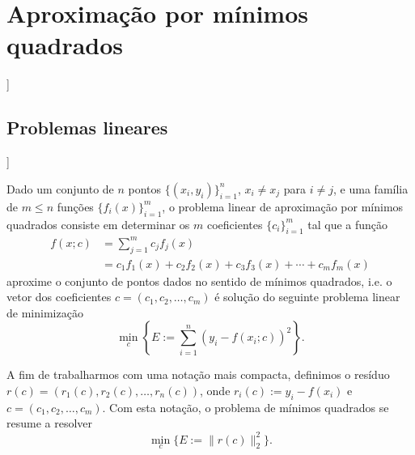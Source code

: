 
\chapter{Aproximação por mínimos quadrados}\label{cap_ajuste}
\thispagestyle{fancy}

\begin{flushleft}
  [[tag:revisar]]
\end{flushleft}

\section{Problemas lineares}\label{cap_ajuste_sec_prob_lin}

\begin{flushleft}
  [[tag:revisar]]
\end{flushleft}

Dado um conjunto de $n$ pontos $\{(x_i,y_i)\}_{i=1}^n$, $x_i\neq x_j$ para $i\neq j$, e uma família de $m \leq n$ funções $\{f_i(x)\}_{i=1}^m$, o problema linear de aproximação por mínimos quadrados consiste em determinar os $m$ coeficientes $\{c_i\}_{i=1}^m$ tal que a função
\begin{align}    
  f(x;c) &= \sum_{j=1}^m c_jf_j(x) \\
         &= c_1f_1(x) + c_2f_2(x) + c_3f_3(x) + \cdots + c_mf_m(x)
\end{align}
aproxime o conjunto de pontos dados no sentido de mínimos quadrados, i.e. o vetor dos coeficientes $c = (c_1, c_2, \dotsc, c_m)$ é solução do seguinte problema linear de minimização
\begin{equation}
  \min_{c} \left\{E:= \sum_{i=1}^n (y_i - f(x_i;c))^2\right\}.
\end{equation}

A fim de trabalharmos com uma notação mais compacta, definimos o resíduo $r(c) = (r_1(c), r_2(c), \dotsc, r_n(c))$, onde $r_i(c) := y_i - f(x_i)$ e $c = (c_1, c_2, \dotsc, c_m)$. Com esta notação, o problema de mínimos quadrados se resume a resolver
\begin{equation}\label{eq:pmq}
  \min_{c} \{E := \|r(c)\|_2^2\}.
\end{equation}

